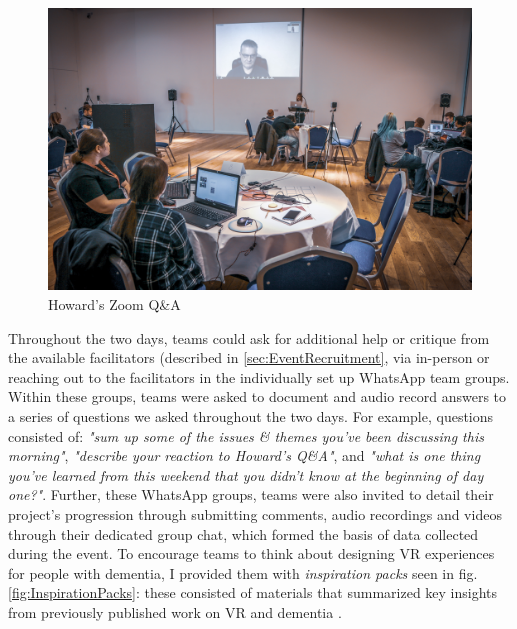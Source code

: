 \begin{figure}
\centering
\includegraphics[width=.8\linewidth]{Images/DemVR/Howard.jpg}
\caption{Howard's Zoom Q\&A}
\label{fig:Howard}
\end{figure}

Throughout the two days, teams could ask for additional help or critique from the available facilitators (described in \ref{sec:EventRecruitment}, via in-person or reaching out to the facilitators in the individually set up WhatsApp team groups. Within these groups, teams were asked to document and audio record answers to a series of questions we asked throughout the two days. For example, questions consisted of: \textit{"sum up some of the issues \& themes you've been discussing this morning"}, \textit{"describe your reaction to Howard's Q\&A"}, and \textit{"what is one thing you've learned from this weekend that you didn't know at the beginning of day one?"}. Further, these WhatsApp groups, teams were also invited to detail their project's progression through submitting comments, audio recordings and videos through their dedicated group chat, which formed the basis of data collected during the event. To encourage teams to think about designing VR experiences for people with dementia, I provided them with \textit{inspiration packs} seen in fig.\ref{fig:InspirationPacks}: these consisted of materials that summarized key insights from previously published work on VR and dementia \citep{hodge_exploring_2018,hodge_exploring_2019}. 

